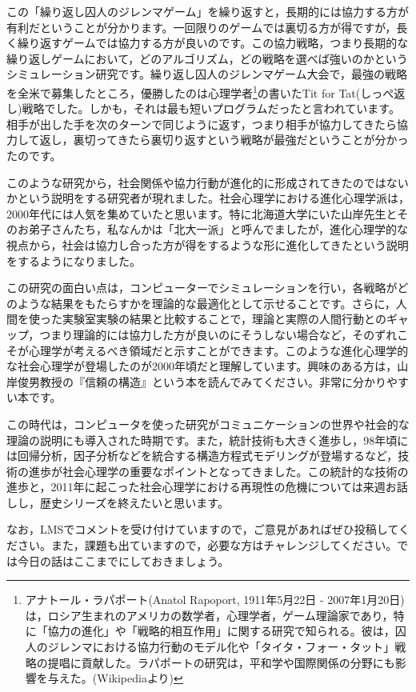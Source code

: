 \documentclass{ltjsbook}
\begin{document}
この「繰り返し囚人のジレンマゲーム」を繰り返すと，長期的には協力する方が有利だということが分かります。一回限りのゲームでは裏切る方が得ですが，長く繰り返すゲームでは協力する方が良いのです。この協力戦略，つまり長期的な繰り返しゲームにおいて，どのアルゴリズム，どの戦略を選べば強いのかというシミュレーション研究です。繰り返し囚人のジレンマゲーム大会で，最強の戦略を全米で募集したところ，優勝したのは心理学者\footnote{アナトール・ラパポート(Anatol Rapoport, 1911年5月22日 - 2007年1月20日)は，ロシア生まれのアメリカの数学者，心理学者，ゲーム理論家であり，特に「協力の進化」や「戦略的相互作用」に関する研究で知られる。彼は，囚人のジレンマにおける協力行動のモデル化や「タイタ・フォー・タット」戦略の提唱に貢献した。ラパポートの研究は，平和学や国際関係の分野にも影響を与えた。(Wikipediaより)}の書いたTit for Tat(しっぺ返し)戦略でした。しかも，それは最も短いプログラムだったと言われています。相手が出した手を次のターンで同じように返す，つまり相手が協力してきたら協力して返し，裏切ってきたら裏切り返すという戦略が最強だということが分かったのです。

このような研究から，社会関係や協力行動が進化的に形成されてきたのではないかという説明をする研究者が現れました。社会心理学における進化心理学派は，2000年代には人気を集めていたと思います。特に北海道大学にいた山岸先生とそのお弟子さんたち，私なんかは「北大一派」と呼んでましたが，進化心理学的な視点から，社会は協力し合った方が得をするような形に進化してきたという説明をするようになりました。

この研究の面白い点は，コンピューターでシミュレーションを行い，各戦略がどのような結果をもたらすかを理論的な最適化として示せることです。さらに，人間を使った実験室実験の結果と比較することで，理論と実際の人間行動とのギャップ，つまり理論的には協力した方が良いのにそうしない場合など，そのずれこそが心理学が考えるべき領域だと示すことができます。このような進化心理学的な社会心理学が登場したのが2000年頃だと理解しています。興味のある方は，山岸俊男教授の『信頼の構造』という本\parencite{Yamagishi}を読んでみてください。非常に分かりやすい本です。

この時代は，コンピュータを使った研究がコミュニケーションの世界や社会的な理論の説明にも導入された時期です。また，統計技術も大きく進歩し，98年頃には回帰分析，因子分析などを統合する構造方程式モデリングが登場するなど，技術の進歩が社会心理学の重要なポイントとなってきました。この統計的な技術の進歩と，2011年に起こった社会心理学における再現性の危機については来週お話しし，歴史シリーズを終えたいと思います。

なお，LMSでコメントを受け付けていますので，ご意見があればぜひ投稿してください。また，課題も出ていますので，必要な方はチャレンジしてください。では今日の話はここまでにしておきましょう。

\printbibliography[title=引用文献]
\end{document}
